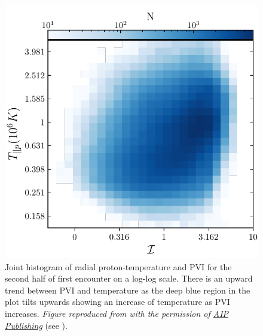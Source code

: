         \begin{figure}
            \begin{center}
                \includegraphics[width=1.\textwidth]{figures/chap6/PVIvsT_hist_masked_lin_mag_psp_par.pdf}
                \caption[Joint histogram of $T_{\parallel p}$ and $\mathcal{I}$]{Joint histogram of
                radial proton-temperature and PVI for the second half of first encounter on a
                log-log scale. There is an upward trend between PVI and temperature as the deep blue
                region in the plot tilts upwards showing an increase of temperature as PVI
                increases. \textit{Figure reproduced from \citet{Qudsi2020} with the permission of
                \href{https://publishing.aip.org/}{AIP Publishing}} (see
                ).}
                \label{fig:pvi_hst_psp}
            \end{center}
        \end{figure}

